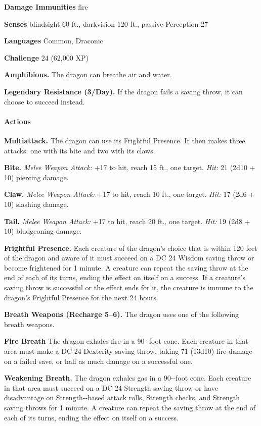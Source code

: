 \documentclass[
]{article}
\begin{document}
\textbf{Damage Immunities} fire

\textbf{Senses} blindsight 60 ft., darkvision 120 ft., passive
Perception 27

\textbf{Languages} Common, Draconic

\textbf{Challenge} 24 (62,000 XP)

\textbf{Amphibious.} The dragon can breathe air and water.

\textbf{Legendary Resistance (3/Day).} If the dragon fails a saving
throw, it can choose to succeed instead.

\hypertarget{actions-55}{%
\paragraph{Actions}\label{actions-55}}

\textbf{Multiattack.} The dragon can use its Frightful Presence. It then
makes three attacks: one with its bite and two with its claws.

\textbf{Bite.} \emph{Melee Weapon Attack:} +17 to hit, reach 15 ft., one
target. \emph{Hit:} 21 (2d10 + 10) piercing damage.

\textbf{Claw.} \emph{Melee Weapon Attack:} +17 to hit, reach 10 ft., one
target. \emph{Hit:} 17 (2d6 + 10) slashing damage.

\textbf{Tail.} \emph{Melee Weapon Attack:} +17 to hit, reach 20 ft., one
target. \emph{Hit:} 19 (2d8 + 10) bludgeoning damage.

\textbf{Frightful Presence.} Each creature of the dragon's choice that
is within 120 feet of the dragon and aware of it must succeed on a DC 24
Wisdom saving throw or become frightened for 1 minute. A creature can
repeat the saving throw at the end of each of its turns, ending the
effect on itself on a success. If a creature's saving throw is
successful or the effect ends for it, the creature is immune to the
dragon's Frightful Presence for the next 24 hours.

\textbf{Breath Weapons (Recharge 5--6).} The dragon uses one of the
following breath weapons.

\textbf{Fire Breath} The dragon exhales fire in a 90-­‐foot cone. Each
creature in that area must make a DC 24 Dexterity saving throw, taking
71 (13d10) fire damage on a failed save, or half as much damage on a
successful one.

\textbf{Weakening Breath.} The dragon exhales gas in a 90-­‐foot cone.
Each creature in that area must succeed on a DC 24 Strength saving throw
or have disadvantage on Strength-­‐based attack rolls, Strength checks,
and Strength saving throws for 1 minute. A creature can repeat the
saving throw at the end of each of its turns, ending the effect on
itself on a success.
\end{document}
